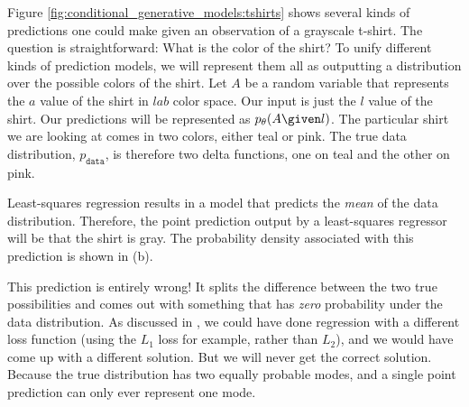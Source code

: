

Figure \ref{fig:conditional_generative_models:tshirts} shows several kinds of predictions one could make given an observation of a grayscale t-shirt. The question is straightforward: What is the color of the shirt? To unify different kinds of prediction models, we will represent them all as outputting a distribution over the possible colors of the shirt. Let $A$ be a random variable that represents the $a$ value of the shirt in $lab$ color space. Our input is just the $l$ value of the shirt. Our predictions will be represented as $p_{\theta}(A \given l)$. The particular shirt we are looking at comes in two colors, either teal or pink. The true data distribution, $p_{\texttt{data}}$, is therefore two delta functions, one on teal and the other on pink.

Least-squares regression results in a model that predicts the \textit{mean} of the data distribution. Therefore, the point prediction output by a least-squares regressor will be that the shirt is gray. The probability density associated with this prediction is shown in \fig{\ref{fig:conditional_generative_models:tshirts}}(b).

This prediction is entirely wrong! It splits the difference between the two true possibilities and comes out with something that has \textit{zero} probability under the data distribution. As discussed in \chap{\ref{chapter:probabilistic_graphical_models}}, we could have done regression with a different loss function (using the $L_1$ loss for example, rather than $L_2$), and we would have come up with a different solution. But we will never get the correct solution. Because the true distribution has two equally probable modes, and a single point prediction can only ever represent one mode.

